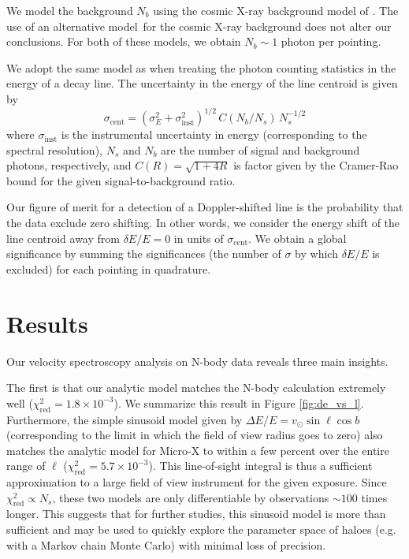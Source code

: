 \documentclass[aps,prd,10pt,twocolumn,superscriptaddress,showpacs]{revtex4-1}
\begin{document}
We model the background $N_b$ using the cosmic X-ray background model of \cite{Ajello:2008xb}.  The use of an alternative model\,\cite{Hickox:2005dz} for the cosmic X-ray background does not alter our conclusions.  For both of these models, we obtain $N_b \sim 1$ photon per pointing. 

We adopt the same model as \cite{speckhard2016} when treating the photon counting statistics in the
energy of a decay line. The uncertainty in the energy of the line centroid is given by
\begin{equation} 
	\sigma_\mathrm{cent} = (\sigma_E^2 + \sigma_\mathrm{inst}^2)^{1/2} \, C(N_b/N_s) \, N_s^{-1/2}
\label{eq:stats}
\end{equation}
where $\sigma_\mathrm{inst}$ is the instrumental uncertainty in energy (corresponding to the spectral
resolution), $N_s$ and $N_b$ are the number of signal and background photons, respectively, and
$C(R)=\sqrt{1+4R}$ is factor given by the Cramer-Rao bound for the given signal-to-background ratio.

Our figure of merit for a detection of a Doppler-shifted line is the probability that the data
exclude zero shifting. In other words, we consider the energy shift of the line centroid
away from $\delta E/E=0$ in units of $\sigma_\mathrm{cent}$.
We obtain a global significance by summing the significances (the
number of $\sigma$ by which $\delta E/E$ is excluded) for each
pointing in quadrature.


\section{Results}
\label{sec:results}

Our velocity spectroscopy analysis on N-body data reveals three main insights.

The first is that our analytic model matches the N-body calculation
extremely well ($\chi^2_\mathrm{red}=1.8\times 10^{-3}$).  We summarize this result in Figure
\ref{fig:de_vs_l}. Furthermore, the simple sinusoid model given by $\Delta E/E
= v_\odot \sin \ell \cos b$ (corresponding to the limit in which the field of view radius goes to
zero) also matches the analytic model for Micro-X to within a few percent over the entire range of
$\ell$ ($\chi^2_\mathrm{red}=5.7\times 10^{-3}$). This line-of-sight integral is thus
a sufficient approximation to a large field of view instrument for the given exposure. Since
$\chi^2_\mathrm{red} \propto N_s$, these two models are 
only differentiable by observations $\sim 100$ times longer.  
This suggests that for further studies, this sinusoid model is more than sufficient and may be
used to quickly explore the parameter space of haloes (e.g. with a Markov chain Monte Carlo) with minimal loss of precision.
\end{document}
